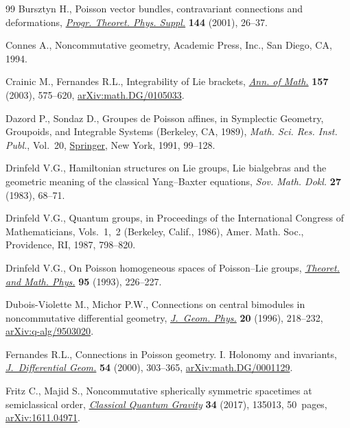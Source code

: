 \documentclass[pdftex]{sigma}
\numberwithin{equation}{section}
\newcommand{\<}{{\langle}}
\renewcommand{\>}{{\rangle}}
\begin{document}
\begin{thebibliography}{99}
Bursztyn H., Poisson vector bundles, contravariant connections and
 deformations, \href{https://doi.org/10.1143/PTPS.144.26}{\textit{Progr. Theoret. Phys. Suppl.}} \textbf{144} (2001),
 26--37.

Connes A., Noncommutative geometry, Academic Press, Inc., San Diego, CA, 1994.

Crainic M., Fernandes R.L., Integrability of {L}ie brackets, \href{https://doi.org/10.4007/annals.2003.157.575}{\textit{Ann. of
 Math.}} \textbf{157} (2003), 575--620, \href{https://arxiv.org/abs/math.DG/0105033}{arXiv:math.DG/0105033}.

Dazord P., Sondaz D., Groupes de {P}oisson affines, in Symplectic Geometry,
 Groupoids, and Integrable Systems ({B}erkeley, {CA}, 1989), \textit{Math.
 Sci. Res. Inst. Publ.}, Vol.~20, \href{https://doi.org/10.1007/978-1-4613-9719-9_6}{Springer}, New York, 1991, 99--128.

Drinfeld V.G., Hamiltonian structures on {L}ie groups, {L}ie bialgebras and the
 geometric meaning of the classical {Y}ang--{B}axter equations, \textit{Sov.
 Math. Dokl.} \textbf{27} (1983), 68--71.

Drinfeld V.G., Quantum groups, in Proceedings of the {I}nternational {C}ongress
 of {M}athematicians, {V}ols.~1,~2 ({B}erkeley, {C}alif., 1986), Amer. Math.
 Soc., Providence, RI, 1987, 798--820.

Drinfeld V.G., On {P}oisson homogeneous spaces of {P}oisson--{L}ie groups,
 \href{https://doi.org/10.1007/BF01017137}{\textit{Theoret. and Math. Phys.}} \textbf{95} (1993), 226--227.

Dubois-Violette M., Michor P.W., Connections on central bimodules in
 noncommutative differential geo\-met\-ry, \href{https://doi.org/10.1016/0393-0440(95)00057-7}{\textit{J.~Geom. Phys.}} \textbf{20}
 (1996), 218--232, \href{https://arxiv.org/abs/q-alg/9503020}{arXiv:q-alg/9503020}.

Fernandes R.L., Connections in {P}oisson geometry. {I}. {H}olonomy and
 invariants, \href{https://doi.org/10.4310/jdg/1214341648}{\textit{J.~Differential Geom.}} \textbf{54} (2000), 303--365,
 \href{https://arxiv.org/abs/math.DG/0001129}{arXiv:math.DG/0001129}.

Fritz C., Majid S., Noncommutative spherically symmetric spacetimes at
 semiclassical order, \href{https://doi.org/10.1088/1361-6382/aa72a5}{\textit{Classical Quantum Gravity}} \textbf{34} (2017),
 135013, 50~pages, \href{https://arxiv.org/abs/1611.04971}{arXiv:1611.04971}.


\end{thebibliography}
\end{document}
